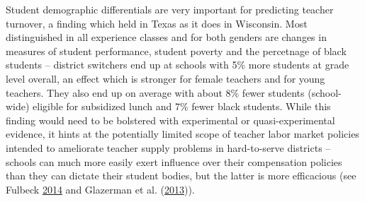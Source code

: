\documentclass[12pt,]{article}
\begin{document}
Student demographic differentials are very important for predicting
teacher turnover, a finding which held in Texas as it does in Wisconsin.
Most distinguished in all experience classes and for both genders are
changes in measures of student performance, student poverty and the
percetnage of black students -- district switchers end up at schools
with 5\% more students at grade level overall, an effect which is
stronger for female teachers and for young teachers. They also end up on
average with about 8\% fewer students (school-wide) eligible for
subsidized lunch and 7\% fewer black students. While this finding would
need to be bolstered with experimental or quasi-experimental evidence,
it hints at the potentially limited scope of teacher labor market
policies intended to ameliorate teacher supply problems in hard-to-serve
districts -- schools can much more easily exert influence over their
compensation policies than they can dictate their student bodies, but
the latter is more efficacious (see Fulbeck
\protect\hyperlink{ref-fulbeck}{2014} and Glazerman et al.
(\protect\hyperlink{ref-glazerman}{2013})).
\end{document}
